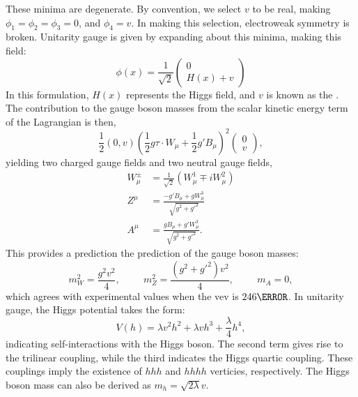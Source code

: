 These minima are degenerate. By convention, we select $v$ to be real, making $\phi_1 = \phi_2 = \phi_3 = 0$, and $\phi_4 = v$.  In making this selection, electroweak symmetry is broken. Unitarity gauge is given by expanding about this minima, making this field:
\begin{equation}
    \phi(x) = \frac{1}{\sqrt{2}} \begin{pmatrix} 0\\ H(x)+v \end{pmatrix}
\end{equation}
%
In this formulation, $H(x)$ represents the Higgs field, and $v$ is known as the . The contribution to the gauge boson masses from the scalar kinetic energy term of the Lagrangian is then,
\begin{equation}
\frac{1}{2}(0,v)(\frac{1}{2}g\tau \cdot W_{\mu} + \frac{1}{2}g'B_{\mu})^2 \begin{pmatrix}0\\v \end{pmatrix},
\end{equation}
yielding two charged gauge fields and two neutral gauge fields,
\begin{align}
    W^{\pm}_{\mu} &= \frac{1}{\sqrt{2}} ( W_{\mu}^1 \mp i W_{\mu}^2)\\
    Z^{\mu} &= \frac{-g'B_{\mu} + g W_{\mu}^{3}}{\sqrt{g^2 + g'^{2}}}\\
    A^{\mu} &= \frac{gB_{\mu} + g' W_{\mu}^{3}}{\sqrt{g^2 + g'^{2}}}.
\end{align}
This provides a prediction the prediction of the gauge boson masses:
%
\begin{equation}
    m^2_W = \frac{g^2 v^2}{4}, \hspace{1cm} m^2_Z = \frac{(g^2 +g'^2)v^2}{4}, \hspace{1cm} m_{A} =0,
\end{equation}
%
which agrees with experimental values when the \gls{vev} is $\unit{246}{\GeV}$. In unitarity gauge, the Higgs potential takes the form:
\begin{equation}
    V(h) = \lambda v^2 h^2 + \lambda v h^3 + \frac{\lambda}{4}h^4,
\end{equation}
%
indicating self-interactions with the Higgs boson. The second term gives rise to the trilinear coupling, while the third indicates the Higgs quartic coupling. These couplings imply the existence of $hhh$ and $hhhh$ verticies, respectively. The Higgs boson mass can also be derived as $m_h = \sqrt{2\lambda}v$. 


